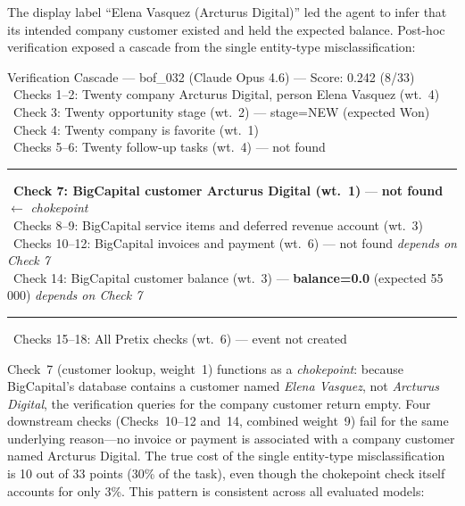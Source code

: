 The display label ``Elena Vasquez (Arcturus Digital)'' led the agent to infer that its intended company customer existed and held the expected balance. Post-hoc verification exposed a cascade from the single entity-type misclassification:

\begin{verifybox}{Verification Cascade --- {\ttfamily bof\_032} (Claude Opus 4.6) --- Score: 0.242 (8/33)}
\small
\cmark\ Checks 1--2: Twenty company Arcturus Digital, person Elena Vasquez (wt.\ 4) \\
\xmark\ Check 3: Twenty opportunity stage (wt.\ 2) --- stage=NEW (expected Won) \\
\cmark\ Check 4: Twenty company is favorite (wt.\ 1) \\
\xmark\ Checks 5--6: Twenty follow-up tasks (wt.\ 4) --- not found \\[4pt]
\hrule\vspace{4pt}
\xmark\ \textbf{Check 7: BigCapital customer Arcturus Digital (wt.\ 1)} --- \textbf{not found} \quad $\leftarrow$ \emph{chokepoint} \\
\cmark\ Checks 8--9: BigCapital service items and deferred revenue account (wt.\ 3) \\
\xmark\ Checks 10--12: BigCapital invoices and payment (wt.\ 6) --- not found \quad \emph{depends on Check 7} \\
\xmark\ Check 14: BigCapital customer balance (wt.\ 3) --- \textbf{balance=0.0} (expected 55\,000) \quad \emph{depends on Check 7} \\[4pt]
\hrule\vspace{4pt}
\xmark\ Checks 15--18: All Pretix checks (wt.\ 6) --- event not created
\end{verifybox}

Check~7 (customer lookup, weight~1) functions as a \emph{chokepoint}: because BigCapital's database contains a customer named \emph{Elena Vasquez}, not \emph{Arcturus Digital}, the verification queries for the company customer return empty. Four downstream checks (Checks~10--12 and~14, combined weight~9) fail for the same underlying reason---no invoice or payment is associated with a company customer named Arcturus Digital. The true cost of the single entity-type misclassification is 10 out of 33 points (30\% of the task), even though the chokepoint check itself accounts for only 3\%. This pattern is consistent across all evaluated models:

